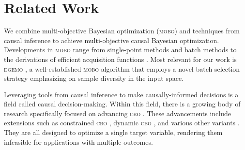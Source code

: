 \section{Related Work}
We combine multi-objective Bayesian optimization (\textsc{mobo}) and techniques from causal inference to achieve multi-objective causal Bayesian optimization.
Developments in \textsc{mobo} range from single-point methods \cite{ParEGO, PAL, USeMO} and batch methods \cite{MOEA/D-EGO, dgemo, qNEHVI} to the derivations of efficient acquisition functions \cite{EHVI,PES}. 
Most relevant for our work is \textsc{dgemo} \cite{dgemo}, a well-established \textsc{mobo} algorithm that employs a novel batch selection strategy emphasizing on sample diversity in the input space.

Leveraging tools from causal inference to make causally-informed decisions is a field called causal decision-making. Within this field, there is a growing body of research specifically focused on advancing \textsc{cbo} \cite{CBO}. These advancements include extensions such as constrained \textsc{cbo} \cite{pmlr-v202-aglietti23a}, dynamic \textsc{cbo} \cite{NEURIPS2021_577bcc91}, and various other variants \cite{pmlr-v206-branchini23a, pmlr-v216-gultchin23a, sussex2023modelbasedcausalbayesianoptimization, sussex2023adversarialcausalbayesianoptimization, cbo_exogenous_learning, causal_elicitation}. They are all designed to optimize a single target variable, rendering them infeasible for applications with multiple outcomes.